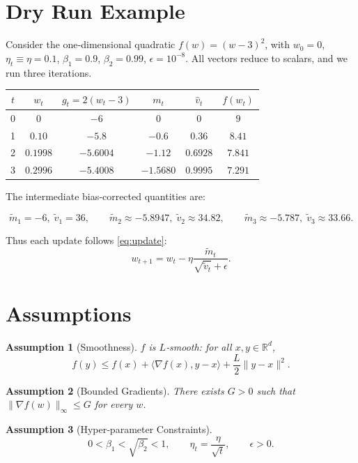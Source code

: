 \documentclass{article}
\newtheorem{assumption}{Assumption}
\newcommand{\R}{\mathbb{R}}
\begin{document}
\section*{Dry Run Example}
Consider the one‑dimensional quadratic $f(w)=(w-3)^2$,
with $w_0=0$, $\eta_t\equiv\eta=0.1$, $\beta_1=0.9$, $\beta_2=0.99$, $\epsilon=10^{-8}$.
All vectors reduce to scalars, and we run three iterations.

\begin{center}
\begin{tabular}{c|c|c|c|c|c}
$t$ & $w_t$ & $g_t=2(w_t-3)$ & $m_t$ & $\hat v_t$ & $f(w_t)$\\ \hline
0 & $0$ & $-6$ & $0$ & $0$ & $9$\\
1 & $0.10$ & $-5.8$ & $-0.6$ & $0.36$ & $8.41$\\
2 & $0.1998$ & $-5.6004$ & $-1.12$ & $0.6928$ & $7.841$\\
3 & $0.2996$ & $-5.4008$ & $-1.5680$ & $0.9995$ & $7.291$
\end{tabular}
\end{center}
The intermediate bias‑corrected quantities are:

\[
\tilde m_1=-6,\;\tilde v_1=36,\qquad
\tilde m_2\approx-5.8947,\;\tilde v_2\approx34.82,\qquad
\tilde m_3\approx-5.787,\;\tilde v_3\approx33.66.
\]

Thus each update follows \eqref{eq:update}:
\[
w_{t+1}=w_t-\eta\frac{\tilde m_t}{\sqrt{\tilde v_t}+\epsilon}.
\]

\section*{Assumptions}
\begin{assumption}[Smoothness]\label{as:smooth}
$f$ is $L$‑smooth: for all $x,y\in\R^{d}$,
\[
f(y)\le f(x)+\langle\nabla f(x),y-x\rangle+\frac{L}{2}\|y-x\|^2 .
\]
\end{assumption}
\begin{assumption}[Bounded Gradients]\label{as:bounded}
There exists $G>0$ such that $\|\nabla f(w)\|_\infty\le G$ for every $w$.
\end{assumption}
\begin{assumption}[Hyper‑parameter Constraints]\label{as:params}
\[
0<\beta_1<\sqrt{\beta_2}<1,\qquad
\eta_t = \frac{\eta}{\sqrt{t}},\qquad
\epsilon>0 .
\]
\end{assumption}
\end{document}

